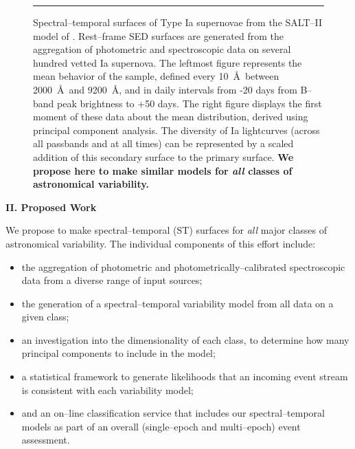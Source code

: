 \begin{figure}[t]
\centerline{ \hfil
{}} \smallskip
\caption[]{\footnotesize Spectral--temporal surfaces of Type Ia supernovae from
the SALT--II model of \cite{2007A&A...466...11G}.  Rest--frame SED surfaces are
generated from the aggregation of photometric and spectroscopic data on several
hundred vetted Ia supernova.  The leftmost figure represents the mean behavior
of the sample, defined every 10~\AA~between 2000~\AA~and 9200~\AA, and in daily
intervals from -20 days from B--band peak brightness to +50 days.  The right
figure displays the first moment of these data about the mean distribution,
derived using principal component analysis.  The diversity of Ia lightcurves
(across all passbands and at all times) can be represented by a scaled addition
of this secondary surface to the primary surface.  {\bf We propose here to make
similar models for {\it all} classes of astronomical variability.}} \medskip
\hrule \label{fig:salt2} \end{figure}

\bigskip \centerline{\bf II. Proposed Work} \smallskip

We propose to make spectral--temporal (ST) surfaces for {\it all} major classes
of astronomical variability.  The individual components of this effort include:

\begin{itemize}

\item the aggregation of photometric and photometrically--calibrated
spectroscopic data from a diverse range of input sources;

\item the generation of a spectral--temporal variability model from all data on
a given class;

\item an investigation into the dimensionality of each class, to determine how
many principal components to include in the model;

\item a statistical framework to generate likelihoods that an incoming event
stream is consistent with each variability model;

\item and an on--line classification service that includes our
spectral--temporal models as part of an overall (single--epoch and multi--epoch)
event assessment.

\end{itemize}

